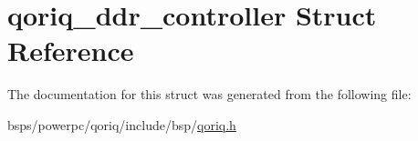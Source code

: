 \hypertarget{structqoriq__ddr__controller}{}\section{qoriq\+\_\+ddr\+\_\+controller Struct Reference}
\label{structqoriq__ddr__controller}


The documentation for this struct was generated from the following file\+:\begin{DoxyCompactItemize}
\item 
bsps/powerpc/qoriq/include/bsp/\mbox{\hyperlink{qoriq_8h}{qoriq.\+h}}\end{DoxyCompactItemize}
